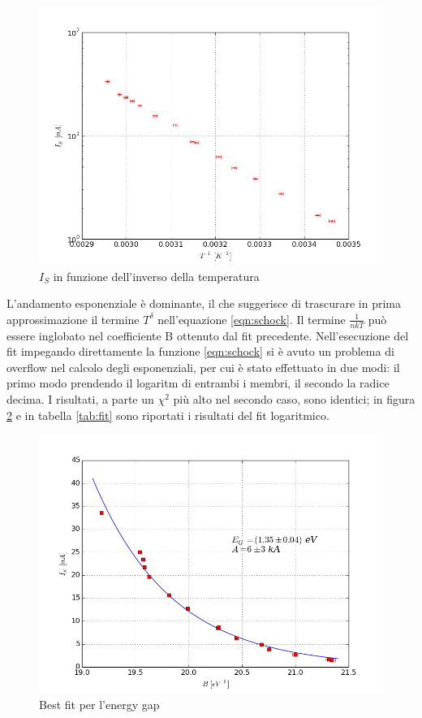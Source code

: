 \documentclass[a4paper]{article}
\begin{document}
\begin{itemize}
\begin{figure}[!h]
\centering
\includegraphics[scale=.5]{iesse}
\caption{$I_S$ in funzione dell'inverso della temperatura}
\label{fig:iesse}
\end{figure}

L'andamento esponenziale è dominante, il che suggerisce di trascurare in prima approssimazione il termine $T^{\delta}$ nell'equazione \ref{eqn:schock}. Il termine $\frac{1}{nkT}$ può essere inglobato nel coefficiente B ottenuto dal fit precedente. Nell'esecuzione del fit impegando direttamente la funzione \ref{eqn:schock} si è avuto un problema di overflow nel calcolo degli esponenziali, per cui è stato effettuato in due modi: il primo modo prendendo il logaritm di entrambi i membri, il secondo la radice decima. I risultati, a parte un $\chi ^2$ più alto nel secondo caso, sono identici; in figura \ref{fig:fiteg} e in tabella \ref{tab:fit} sono riportati i risultati del fit logaritmico.

\begin{figure}[!h]
\centering
\includegraphics[scale=.5]{fit_eg}
\caption{Best fit per l'energy gap}
\label{fig:fiteg}
\end{figure}


\end{itemize}
\end{document}
